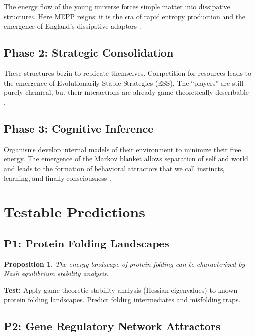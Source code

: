 \documentclass[12pt,a4paper]{article}
\newtheorem{proposition}{Proposition}
\theoremstyle{remark}
\begin{document}
The energy flow of the young universe forces simple matter into dissipative structures. Here MEPP reigns; it is the era of rapid entropy production and the emergence of England's dissipative adaptors \citep{EcosystemMEPP}.

\subsection{Phase 2: Strategic Consolidation}

These structures begin to replicate themselves. Competition for resources leads to the emergence of Evolutionarily Stable Strategies (ESS). The ``players'' are still purely chemical, but their interactions are already game-theoretically describable \citep{MaynardSmithPrice1973}.

\subsection{Phase 3: Cognitive Inference}

Organisms develop internal models of their environment to minimize their free energy. The emergence of the Markov blanket allows separation of self and world and leads to the formation of behavioral attractors that we call instincts, learning, and finally consciousness \citep{FristonFreeEnergy}.

\section{Testable Predictions}
\label{sec:predictions}

\subsection{P1: Protein Folding Landscapes}

\begin{proposition}
The energy landscape of protein folding can be characterized by Nash equilibrium stability analysis.
\end{proposition}

\textbf{Test:} Apply game-theoretic stability analysis (Hessian eigenvalues) to known protein folding landscapes. Predict folding intermediates and misfolding traps.

\subsection{P2: Gene Regulatory Network Attractors}
\end{document}
